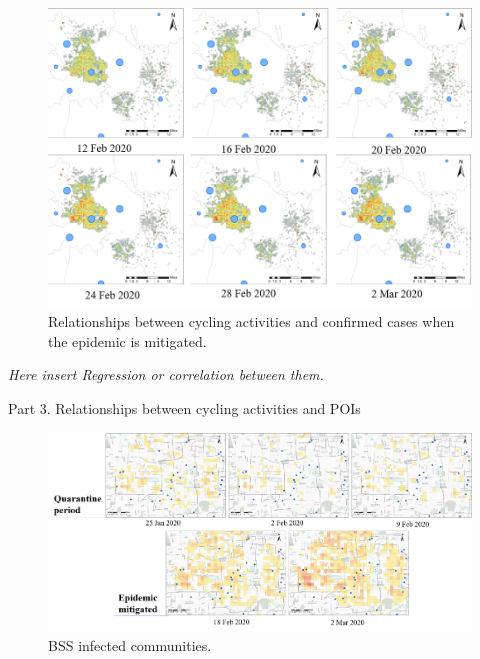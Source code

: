 \documentclass[preprints,ijgi,submit,moreauthors]{Definitions/mdpi}
\begin{document}
\begin{figure}[H]
    \centering
    \includegraphics[width=\textwidth]{Figures/Aggregated counts respect time(phase3).png}
    \caption{Relationships between cycling activities and confirmed cases when the epidemic is mitigated.}
    \label{fig:BSS and confirmed cases phase 3}
\end{figure}

\textit{Here insert Regression or correlation between them.}

Part 3. Relationships between cycling activities and POIs

\begin{figure}[H]
    \centering
    \includegraphics[width=\textwidth]{Figures/withComfirnedCases.png}
    \caption{BSS infected communities.}
    \label{fig:BSS and confirmed cases phase 3}
\end{figure}
\end{document}
